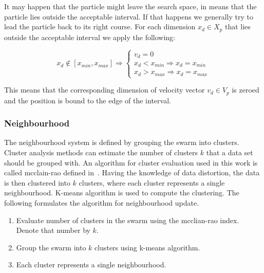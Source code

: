 \documentclass[runningheads, a4paper]{llncs}
\begin{document}
It may happen that the particle might leave the search space, in means that the particle lies outside the acceptable interval. If that happens we generally try to lead the particle back to its right course. For each dimension $x_{d} \in X_p$ that lies  outside the acceptable interval we apply the following:

  \[
	x_{d} \notin [x_{min}, x_{max}] \Rightarrow \left \{
                \begin{array}{ll}
                  v_{d} = 0 \\
                  x_d < x_{min} \Rightarrow x_d = x_{min} \\
                  x_d > x_{max} \Rightarrow x_d = x_{max}
                \end{array}
              \right.
  \]

This means that the corresponding dimension of velocity vector $v_d \in V_p$ is zeroed and the position is bound to the edge of the interval.

\subsubsection{Neighbourhood}
The neighbourhood system is defined by grouping the swarm into clusters. Cluster analysis methods can estimate the number of clusters $k$ that a data set should be grouped with. An algorithm for cluster evaluation used in this work is called mcclain-rao defined in~\cite{mc_rao}. Having the knowledge of data distortion, the data is then clustered into $k$ clusters, where each cluster represents a single neighbourhood. K-means algorithm is used to compute the clustering. The following formulates the algorithm for neighbourhood update.

\begin{enumerate}
	\item Evaluate number of clusters in the swarm using the mcclian-rao index. Denote that number by $k$.
	\item Group the swarm into $k$ clusters using k-means algorithm.
	\item Each cluster represents a single neighbourhood.
\end{enumerate}


\end{document}
